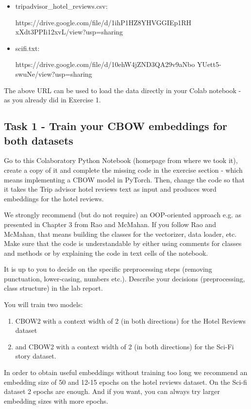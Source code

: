 \documentclass[fleqn,10pt]{SelfArx} %
\begin{document}
\begin{itemize}[noitemsep] %
	\item tripadvisor\_hotel\_reviews.csv:
	
	https://drive.google.com/file/d/1ihP1HZ8YHVGGIEp1RH \linebreak xXdt3PPIi12xvL/view?usp=sharing
	\item scifi.txt:
	
	https://drive.google.com/file/d/10ehW4jZND3QA29v9aNbo \linebreak YUett5-swuNe/view?usp=sharing
\end{itemize}
The above URL can be used to load the data directly in your Colab notebook - as you already did in Exercise 1.

\subsection{Task 1 - Train your CBOW embeddings for both datasets}
Go to this Colaboratory Python Notebook (homepage from where we took it), create a copy of it and complete the missing code in the exercise section - which means implementing a CBOW model in PyTorch. Then, change the code so that it takes the Trip advisor hotel reviews text as input and produces word embeddings for the hotel reviews.

We strongly recommend (but do not require) an OOP-oriented approach e.g. as presented in Chapter 3 from Rao and
McMahan. If you follow Rao and McMahan, that means building the classes for the vectorizer, data loader, etc. Make sure
that the code is understandable by either using comments for classes and methods or by explaining the code in text cells of the notebook.

It is up to you to decide on the specific preprocessing steps (removing punctuation, lower-casing, numbers etc.).
Describe your decisions (preprocessing, class structure) in the lab report.

You will train two models:
\begin{enumerate}[noitemsep]
    \item CBOW2 with a context width of 2 (in both directions) for the Hotel Reviews dataset
    \item and CBOW2 with a context width of 2 (in both directions) for the Sci-Fi story dataset.
\end{enumerate}


In order to obtain useful embeddings without training too long we recommend an embedding size of 50 and 12-15 epochs
on the hotel reviews dataset. On the Sci-fi dataset 2 epochs are enough. And if you want, you can always try larger embedding sizes with more epochs.
\end{document}

